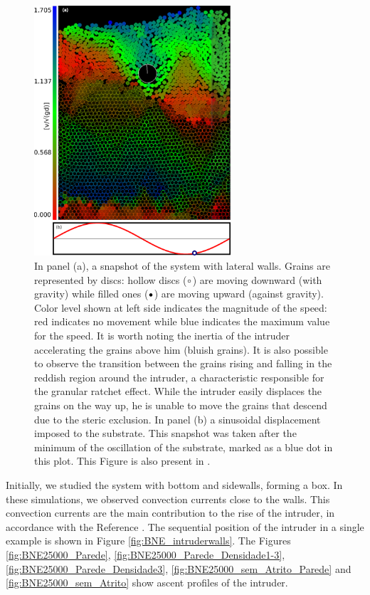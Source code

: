 \begin{figure}[H]
    \centering
    \includegraphics[width=0.65\textwidth]{04-figuras/BNE.pdf}
    \caption[BNE snapshot.]{In panel (a), a snapshot of the system with lateral walls. Grains are represented by discs: hollow discs ($\textcolor{black}{\circ}$) are moving downward (with gravity) while filled ones ($\textcolor{black}{\bullet}$) are moving upward (against gravity). Color level shown at left side indicates the magnitude of the speed: red indicates no movement while blue indicates the maximum value for the speed. It is worth noting the inertia of the intruder accelerating the grains above him (bluish grains). It is also possible to observe the transition between the grains rising and falling in the reddish region around the intruder, a characteristic responsible for the granular ratchet effect. While the intruder easily displaces the grains on the way up, he is unable to move the grains that descend due to the steric exclusion. In panel (b) a sinusoidal displacement imposed to the substrate. This snapshot was taken after the minimum of the oscillation of the substrate, marked as a blue dot in this plot. This Figure is also present in \cite{Large-deviation_quantification_of_boundary_conditions_on_the_Brazil_nut_effect}.}
    \label{fig:BNE}
\end{figure}

    Initially, we studied the system with bottom and sidewalls, forming a box. In these simulations, we observed convection currents close to the walls. This convection currents are the main contribution to the rise of the intruder, in accordance with the Reference \cite{Scaling_behavior_in_convection-driven_Brazil-nut_effect}. The sequential position of the intruder in a single example is shown in Figure \ref{fig:BNE_intruderwalls}. The Figures \ref{fig:BNE25000_Parede}, \ref{fig:BNE25000_Parede_Densidade1-3}, \ref{fig:BNE25000_Parede_Densidade3}, \ref{fig:BNE25000_sem_Atrito_Parede} and \ref{fig:BNE25000_sem_Atrito} show ascent profiles of the intruder.


